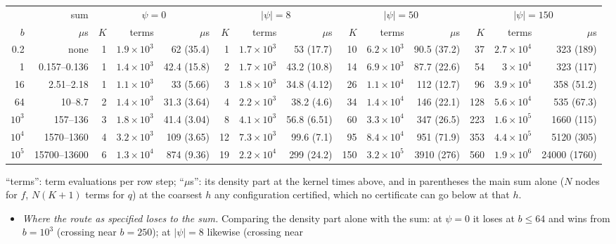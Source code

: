 \begin{enumerate}
\begin{center}
\begin{tabular}{rr|rrr|rrr|rrr|rrr}\toprule
& sum & \multicolumn{3}{c|}{$\psi=0$} & \multicolumn{3}{c|}{$|\psi|=8$} & \multicolumn{3}{c|}{$|\psi|=50$} &
\multicolumn{3}{c}{$|\psi|=150$}\\
$b$ & $\mu$s & $K$ & terms & $\mu$s & $K$ & terms & $\mu$s & $K$ & terms & $\mu$s & $K$ & terms & $\mu$s\\\midrule
0.2 & none & 1 & $1.9\times10^{3}$ & 62 (35.4) & 1 & $1.7\times10^{3}$ & 53 (17.7) & 10 & $6.2\times10^{3}$ & 90.5 (37.2) & 37 & $2.7\times10^{4}$ & 323 (189)\\
1 & 0.157--0.136 & 1 & $1.4\times10^{3}$ & 42.4 (15.8) & 2 & $1.7\times10^{3}$ & 43.2 (10.8) & 14 & $6.9\times10^{3}$ & 87.7 (22.6) & 54 & $3\times10^{4}$ & 323 (117)\\
16 & 2.51--2.18 & 1 & $1.1\times10^{3}$ & 33 (5.66) & 3 & $1.8\times10^{3}$ & 34.8 (4.12) & 26 & $1.1\times10^{4}$ & 112 (12.7) & 96 & $3.9\times10^{4}$ & 358 (51.2)\\
64 & 10--8.7 & 2 & $1.4\times10^{3}$ & 31.3 (3.64) & 4 & $2.2\times10^{3}$ & 38.2 (4.6) & 34 & $1.4\times10^{4}$ & 146 (22.1) & 128 & $5.6\times10^{4}$ & 535 (67.3)\\
$10^3$ & 157--136 & 3 & $1.8\times10^{3}$ & 41.4 (3.04) & 8 & $4.1\times10^{3}$ & 56.8 (6.51) & 60 & $3.3\times10^{4}$ & 347 (26.5) & 223 & $1.6\times10^{5}$ & 1660 (115)\\
$10^4$ & 1570--1360 & 4 & $3.2\times10^{3}$ & 109 (3.65) & 12 & $7.3\times10^{3}$ & 99.6 (7.1) & 95 & $8.4\times10^{4}$ & 951 (71.9) & 353 & $4.4\times10^{5}$ & 5120 (305)\\
$10^5$ & 15700--13600 & 6 & $1.3\times10^{4}$ & 874 (9.36) & 19 & $2.2\times10^{4}$ & 299 (24.2) & 150 & $3.2\times10^{5}$ & 3910 (276) & 560 & $1.9\times10^{6}$ & 24000 (1760)\\
\bottomrule
\end{tabular}
\end{center}
``terms'': term evaluations per row step; ``$\mu$s'': its density part at the kernel times above, and in
parentheses the main sum alone ($N$ nodes for $f$, $N(K+1)$ terms for $q$) at the coarsest $h$ any configuration
certified, which no certificate can go below at that $h$.
\begin{itemize}
\item \emph{Where the route as specified loses to the sum.} Comparing the density part alone with the sum: at
$\psi=0$ it loses at $b\le64$ and wins from $b=10^3$ (crossing near $b=250$); at $|\psi|=8$ likewise (crossing near

\end{itemize}
\end{enumerate}
